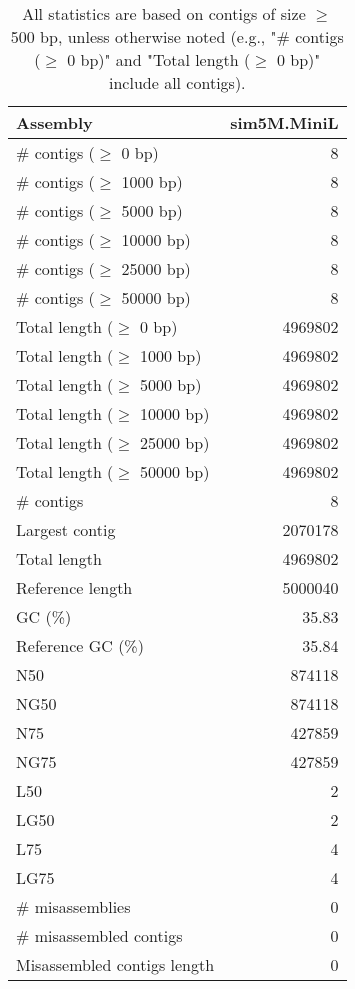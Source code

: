 \documentclass[12pt,a4paper]{article}
\begin{document}
\begin{table}[ht]
\begin{center}
\caption{All statistics are based on contigs of size $\geq$ 500 bp, unless otherwise noted (e.g., "\# contigs ($\geq$ 0 bp)" and "Total length ($\geq$ 0 bp)" include all contigs).}
\begin{tabular}{|l*{1}{|r}|}
\hline
Assembly & sim5M.MiniL \\ \hline
\# contigs ($\geq$ 0 bp) & 8 \\ \hline
\# contigs ($\geq$ 1000 bp) & 8 \\ \hline
\# contigs ($\geq$ 5000 bp) & 8 \\ \hline
\# contigs ($\geq$ 10000 bp) & 8 \\ \hline
\# contigs ($\geq$ 25000 bp) & 8 \\ \hline
\# contigs ($\geq$ 50000 bp) & 8 \\ \hline
Total length ($\geq$ 0 bp) & 4969802 \\ \hline
Total length ($\geq$ 1000 bp) & 4969802 \\ \hline
Total length ($\geq$ 5000 bp) & 4969802 \\ \hline
Total length ($\geq$ 10000 bp) & 4969802 \\ \hline
Total length ($\geq$ 25000 bp) & 4969802 \\ \hline
Total length ($\geq$ 50000 bp) & 4969802 \\ \hline
\# contigs & 8 \\ \hline
Largest contig & 2070178 \\ \hline
Total length & 4969802 \\ \hline
Reference length & 5000040 \\ \hline
GC (\%) & 35.83 \\ \hline
Reference GC (\%) & 35.84 \\ \hline
N50 & 874118 \\ \hline
NG50 & 874118 \\ \hline
N75 & 427859 \\ \hline
NG75 & 427859 \\ \hline
L50 & 2 \\ \hline
LG50 & 2 \\ \hline
L75 & 4 \\ \hline
LG75 & 4 \\ \hline
\# misassemblies & 0 \\ \hline
\# misassembled contigs & 0 \\ \hline
Misassembled contigs length & 0 \\ \hline

\end{tabular}
\end{center}
\end{table}
\end{document}
